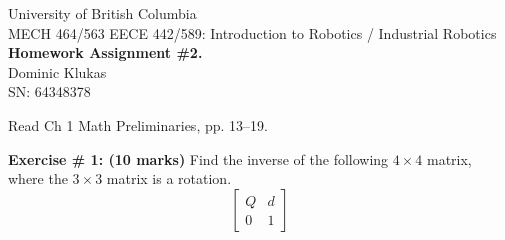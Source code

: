 \documentclass[11pt]{article}
\begin{document}
\begin{center}
{\Large University of British Columbia}\\[4pt]
{\large MECH 464/563 \quad EECE 442/589: Introduction to Robotics / Industrial Robotics}\\[8pt]
{\large \textbf{Homework Assignment \#2.}}\\
{Dominic Klukas}\\
{SN: 64348378}
\end{center}

\vspace{8pt}
Read Ch 1 Math Preliminaries, pp. 13--19.

\vspace{10pt}
\noindent \textbf{Exercise \# 1: (10 marks)} Find the inverse of the following $4\times 4$ matrix, where the $3\times 3$
matrix is a rotation.
\[
\begin{bmatrix}
Q & d\\
0 & 1
\end{bmatrix}
\]
\end{document}
